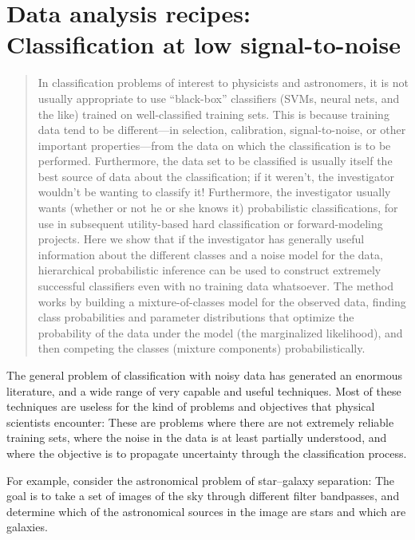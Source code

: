 \documentclass[12pt, letterpaper]{article}
\begin{document}
\section*{Data analysis recipes:\\
          Classification at low signal-to-noise}

\begin{abstract}
In classification problems of interest to physicists and astronomers,
it is not usually appropriate to use ``black-box'' classifiers (SVMs,
neural nets, and the like) trained on well-classified training sets.
This is because training data tend to be different---in selection,
calibration, signal-to-noise, or other important properties---from the
data on which the classification is to be performed.  Furthermore, the
data set to be classified is usually itself the best source of data
about the classification; if it weren't, the investigator wouldn't be
wanting to classify it!  Furthermore, the investigator usually wants
(whether or not he or she knows it) probabilistic classifications, for
use in subsequent utility-based hard classification or
forward-modeling projects.  Here we show that if the investigator has
generally useful information about the different classes and a noise
model for the data, hierarchical probabilistic inference can be used
to construct extremely successful classifiers even with no training
data whatsoever.  The method works by building a mixture-of-classes
model for the observed data, finding class probabilities and parameter
distributions that optimize the probability of the data under the
model (the marginalized likelihood), and then competing the classes
(mixture components) probabilistically.
\end{abstract}

The general problem of classification with noisy data has generated an
enormous literature, and a wide range of very capable and useful
techniques.  Most of these techniques are useless for the kind of
problems and objectives that physical scientists encounter: These are
problems where there are not extremely reliable training sets, where
the noise in the data is at least partially understood, and where the
objective is to propagate uncertainty through the classification
process.

For example, consider the astronomical problem of star--galaxy
separation: The goal is to take a set of images of the sky through
different filter bandpasses, and determine which of the astronomical
sources in the image are stars and which are galaxies.
\end{document}
